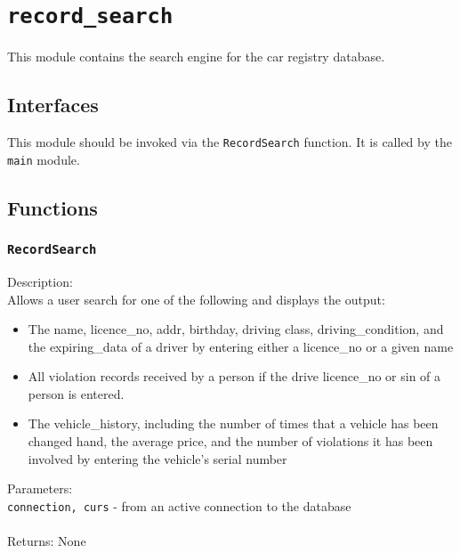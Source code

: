 \documentclass[12pt]{article}
\begin{document}
\newpage
\section{\texttt{record\_search}}
This module contains the search engine for the car registry database.
\subsection{Interfaces}
This module should be invoked via the \texttt{RecordSearch} function. It is called by the \texttt{main} module.

\subsection{Functions}

\subsubsection{\texttt{RecordSearch}}
Description:\\
\indent Allows a user search for one of the following and displays the output:
\begin{itemize}
\item The name, licence\_no, addr, birthday, driving class, driving\_condition,
    and the expiring\_data of a driver by entering either a licence\_no or a
    given name
\item All violation records received by a person if  the drive licence\_no or 
    sin of a person is entered.
\item The vehicle\_history, including the number of times that a vehicle has 
    been changed hand, the average price, and the number of violations it 
    has been involved by entering the vehicle's serial number
\end{itemize}
Parameters:\\
\indent\texttt{connection, curs} - from an active connection to the database\\\\
Returns: None
\end{document}
